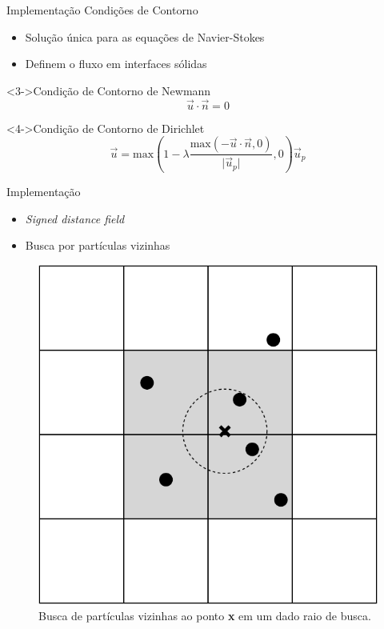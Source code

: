 \documentclass[aspectratio=169,xcolor=dvipsnames]{beamer}
\begin{document}
\begin{frame}{Implementação}
    Condições de Contorno
    \begin{itemize}
        \item<1-> Solução única para as equações de Navier-Stokes
        \item<2-> Definem o fluxo em interfaces sólidas
    \end{itemize}
    
    \begin{block}<3->{Condição de Contorno de Newmann}
        \begin{equation}
            \Vec{u} \cdot \Vec{n} = 0 
        \end{equation}
    \end{block}
    
    \pause
    
    \begin{block}<4->{Condição de Contorno de Dirichlet}
        \begin{equation}            
            \Vec{u} = \text{max}\left( 1 - \lambda \frac{\text{max}\left(-\Vec{u} \cdot \Vec{n},0\right)}{\lvert \Vec{u}_{p}\rvert}, 0\right) \Vec{u}_{p}
        \end{equation}
    \end{block}
\end{frame}

\begin{frame}{Implementação}
    \begin{itemize}[<+->]
        \item \textit{Signed distance field}
        \item Busca por partículas vizinhas
    \end{itemize}
    
    {
    \begin{figure}
        \centering
        \includegraphics[width=0.3\linewidth]{figures/PointGridHashSearcher.pdf}
        \caption{Busca de partículas vizinhas ao ponto \textbf{x} em um dado raio de busca.}
        \label{fig:gridhashsearcher}
    \end{figure}
    }
\end{frame}
\end{document}
